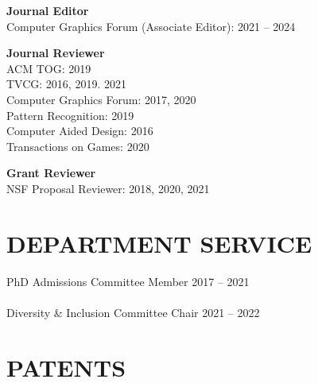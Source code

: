 \documentclass[line,margin]{res}
\begin{document}
\begin{resume}
\textbf{Journal Editor}\\
Computer Graphics Forum (Associate Editor): 2021 -- 2024

\textbf{Journal Reviewer}\\
ACM TOG: 2019\\
TVCG: 2016, 2019. 2021\\
Computer Graphics Forum: 2017, 2020\\
Pattern Recognition: 2019\\
Computer Aided Design: 2016\\
Transactions on Games: 2020

\textbf{Grant Reviewer}\\
NSF Proposal Reviewer: 2018, 2020, 2021


\section{DEPARTMENT SERVICE}

PhD Admissions Committee Member \hfill 2017 -- 2021
\\ \\
Diversity \& Inclusion Committee Chair \hfill 2021 -- 2022








\section{PATENTS}


\end{resume}
\end{document}
